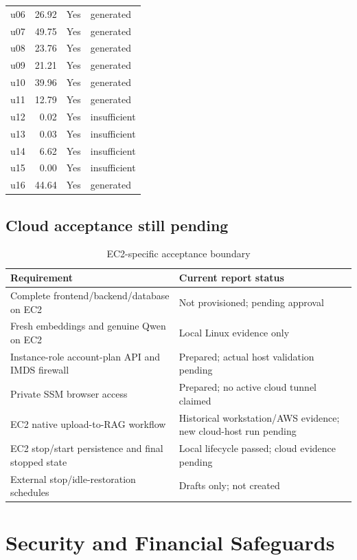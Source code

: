 \begin{longtable}{lrrl}
u06&26.92&Yes&generated\\
u07&49.75&Yes&generated\\
u08&23.76&Yes&generated\\
u09&21.21&Yes&generated\\
u10&39.96&Yes&generated\\
u11&12.79&Yes&generated\\
u12&0.02&Yes&insufficient\\
u13&0.03&Yes&insufficient\\
u14&6.62&Yes&insufficient\\
u15&0.00&Yes&insufficient\\
u16&44.64&Yes&generated\\
\bottomrule\end{longtable}
\section{Cloud acceptance still pending}
\par\begin{table}[htbp]\caption{EC2-specific acceptance boundary}\small\begin{tabularx}{\linewidth}{YY}\toprule Requirement&Current report status\\\midrule
Complete frontend/backend/database on EC2&Not provisioned; pending approval\\
Fresh embeddings and genuine Qwen on EC2&Local Linux evidence only\\
Instance-role account-plan API and IMDS firewall&Prepared; actual host validation pending\\
Private SSM browser access&Prepared; no active cloud tunnel claimed\\
EC2 native upload-to-RAG workflow&Historical workstation/AWS evidence; new cloud-host run pending\\
EC2 stop/start persistence and final stopped state&Local lifecycle passed; cloud evidence pending\\
External stop/idle-restoration schedules&Drafts only; not created\\\bottomrule\end{tabularx}\end{table}\par
\chapter{Security and Financial Safeguards}
\footnotesize
